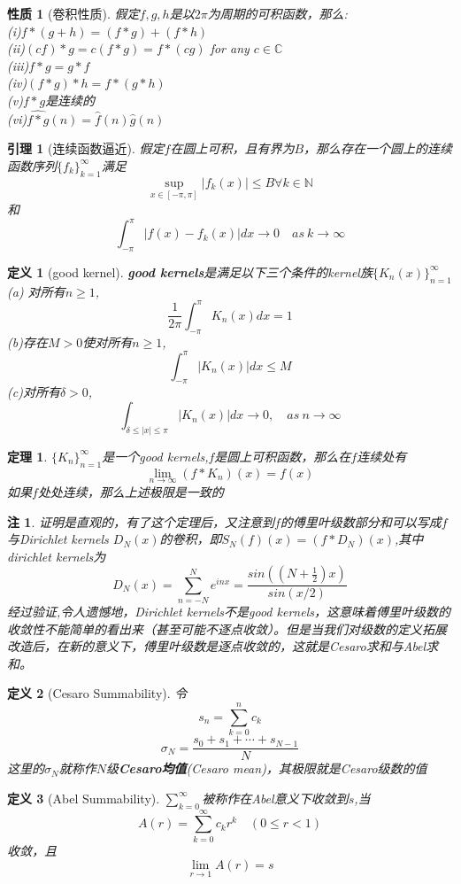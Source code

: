 \documentclass[UTF8]{ctexart}
\newtheorem{dfnt}{定义}
\newtheorem{thr}{定理}
\newtheorem{lemma}{引理}
\newtheorem*{note}{注}
\newtheorem*{pro}{性质}
\begin{document}
\begin{pro}[卷积性质]
假定$f,g,h$是以$2\pi$为周期的可积函数，那么: \\
(i)$f*(g+h) = (f*g) + (f*h)$ \\
(ii)$(cf)*g=c(f*g)=f*(cg)$ for any $c \in \mathbb{C}$ \\
(iii)$f*g = g*f$  \\
(iv)$(f*g)*h = f*(g*h)$ \\
(v)$f*g$是连续的 \\
(vi)$\hat{f*g}(n) = \hat{f}(n)\hat{g}(n)$ 
\end{pro}
\begin{lemma}[连续函数逼近]
假定$f$在圆上可积，且有界为$B$，那么存在一个圆上的连续函数序列$\{ f_k \}^{\infty}_{k=1}$满足$$\sup _{x \in [-\pi,\pi]} |f_k(x)| \leq B \forall k \in \mathbb{N}$$和$$\int^{\pi}_{-\pi}|f(x)-f_k(x)|dx \rightarrow 0 \quad as \  k \rightarrow \infty$$
\end{lemma}
\begin{dfnt}[good kernel]
\textbf{good kernels}是满足以下三个条件的kernel族$\{K_n(x)\}^{\infty}_{n=1}$\\
(a) 对所有$n\geq 1$,$$\frac{1}{2\pi}\int^{\pi}_{-\pi}K_n(x)dx=1$$
(b)存在$M>0$使对所有$n \geq 1$,$$\int^{\pi}_{-\pi}|K_n(x)|dx \leq M$$
(c)对所有$\delta>0$,$$\int_{\delta \leq |x| \leq \pi} |K_n(x)|dx \rightarrow 0, \quad as \  n\rightarrow \infty$$
\end{dfnt}
\begin{thr}
$\{K_n\}^{\infty}_{n=1}$是一个good kernels,$f$是圆上可积函数，那么在$f$连续处有$$\lim_{n \rightarrow \infty}(f*K_n)(x) = f(x) $$如果$f$处处连续，那么上述极限是一致的
\end{thr}
\begin{note}
证明是直观的，有了这个定理后，又注意到$f$的傅里叶级数部分和可以写成$f$与Dirichlet kernels $D_N(x)$的卷积，即$S_N(f)(x)=(f*D_N)(x)$,其中dirichlet kernels为$$D_N(x) = \sum_{n=-N}^{N} e^{inx} = \frac{sin((N+\frac{1}{2})x)}{sin(x/2)}$$经过验证,令人遗憾地，Dirichlet kernels不是good kernels，这意味着傅里叶级数的收敛性不能简单的看出来（甚至可能不逐点收敛）。但是当我们对级数的定义拓展改造后，在新的意义下，傅里叶级数是逐点收敛的，这就是Cesaro求和与Abel求和。
\end{note}
\begin{dfnt}[Cesaro Summability]
令$$s_n = \sum _{k=0}^{n}c_k$$$$\sigma_N = \frac{s_0+s_1+\cdots+s_{N-1}}{N}$$这里的$\sigma_N$就称作$N$级\textbf{Cesaro均值}(Cesaro mean)，其极限就是Cesaro级数的值
\end{dfnt}
\begin{dfnt}[Abel Summability]
$\sum_{k=0}^{\infty}$被称作在Abel意义下收敛到$s$,当$$A(r) = \sum_{k=0}^{\infty}c_k r^k \quad (0 \leq r<1)$$收敛，且$$\lim_{r\rightarrow 1}A(r) = s$$
\end{dfnt}
\end{document}
